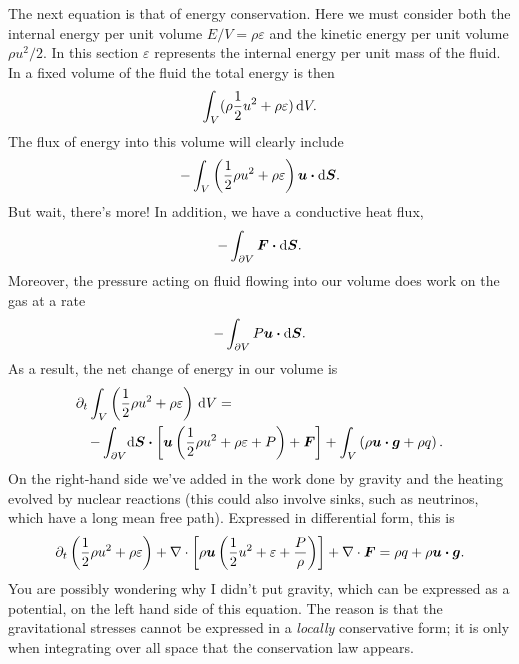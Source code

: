 The next equation is that of energy conservation. Here we must consider both the internal energy per unit volume $E/V = \rho \varepsilon$ and the kinetic energy per unit volume $\rho u^{2}/2$.  In this section $\varepsilon$ represents the internal energy per unit mass of the fluid. In a fixed volume of the fluid the total energy is then 
\[ \int_{V}(\rho \frac{1}{2}u^{2} + \rho \varepsilon)\,\mathrm{d} V. \]
The flux of energy into this volume will clearly include
\[ -\int_{V}\left(\frac{1}{2}\rho u^{2} + \rho \varepsilon\right) \boldsymbol{u}\boldsymbol{\cdot}\mathrm{d}\boldsymbol{S}. \]
But wait, there's more!  In addition, we have a conductive heat flux, 
\[-\int_{\partial V}\boldsymbol{F}\boldsymbol{\cdot}\mathrm{d}\boldsymbol{S}.\] 
Moreover, the pressure acting on fluid flowing into our volume does work on the gas at a rate 
\[-\int_{\partial V}P\boldsymbol{u}\boldsymbol{\cdot}\mathrm{d}\boldsymbol{S}.\] 
As a result, the net change of energy in our volume is
\begin{eqnarray}
\lefteqn{\partial_{t}\int_{V}\left(\frac{1}{2}\rho u^{2} + \rho \varepsilon\right)\nsp\dif V = }\nonumber \\
 && -\int_{\partial V} \!\dif\bvec{S}\vdot\left[\vu\left(\frac{1}{2}\rho u^{2} + \rho \varepsilon + P\right) + \bvec{F}\right] + \int_{V} \left( \rho \vu\vdot\bvec{g} + \rho q\right).
\label{e.energy-1}
\end{eqnarray}
On the right-hand side we've added in the work done by gravity and the heating evolved by nuclear reactions (this could also involve sinks, such as neutrinos, which have a long mean free path).
Expressed in differential form, this is
\begin{equation}\label{e.energy-2}
 \partial_{t}\left(\frac{1}{2}\rho u^{2} + \rho \varepsilon\right) 
 	+ \nabla \cdot\left[\rho\boldsymbol{u}\left(\frac{1}{2} u^{2} + \varepsilon + \frac{P}{\rho}\right)\right]
	+ \nabla \cdot\boldsymbol{F} = \rho q + \rho \boldsymbol{u}\boldsymbol{\cdot}\boldsymbol{g}.
\end{equation}
You are possibly wondering why I didn't put gravity, which can be expressed as a potential, on the left hand side of this equation.  The reason is that the gravitational stresses cannot be expressed in a  \emph{locally} conservative form; it is only when integrating over all space that the conservation law appears.

